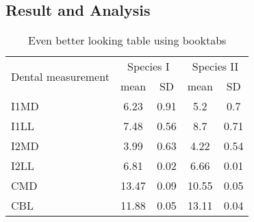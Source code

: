 \subsection{Result and Analysis}
\begin{table}
	\caption{Even better looking table using booktabs}\label{table:good_table}
	\centering

	\begin{tabular}{l c c c c}
		\toprule
		\multirow{2}{*}{Dental measurement} & \multicolumn{2}{c}{Species I} & \multicolumn{2}{c}{Species II}                \\
		\cmidrule{2-5}
		                                    & mean                          & SD                             & mean  & SD   \\
		\midrule
		I1MD                                & 6.23                          & 0.91                           & 5.2   & 0.7  \\

		I1LL                                & 7.48                          & 0.56                           & 8.7   & 0.71 \\

		I2MD                                & 3.99                          & 0.63                           & 4.22  & 0.54 \\

		I2LL                                & 6.81                          & 0.02                           & 6.66  & 0.01 \\

		CMD                                 & 13.47                         & 0.09                           & 10.55 & 0.05 \\

		CBL                                 & 11.88                         & 0.05                           & 13.11 & 0.04 \\
		\bottomrule
	\end{tabular}
\end{table}

